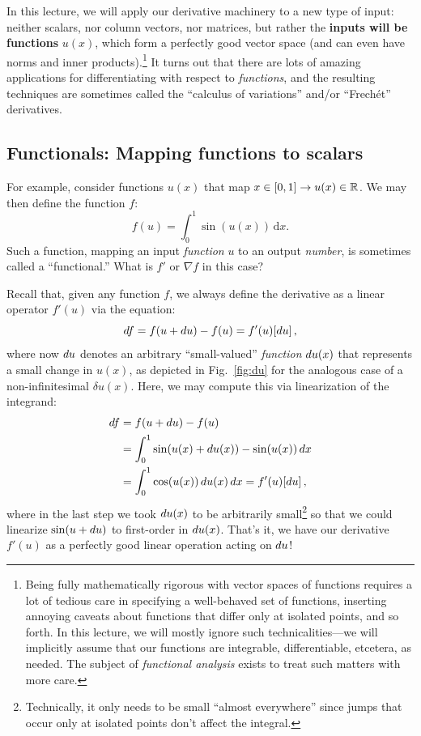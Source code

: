 In this lecture, we will apply our derivative machinery to a new type of input: neither scalars, nor column vectors, nor matrices, but rather the \textbf{inputs will be functions} $u(x)$, which form a perfectly good vector space (and can even have norms and inner products).\footnote{Being fully mathematically rigorous with vector spaces of functions requires a lot of tedious care in specifying a well-behaved set of functions, inserting annoying caveats about functions that differ only at isolated points, and so forth. In this lecture, we will mostly ignore such technicalities---we will implicitly assume that our functions are integrable, differentiable, etcetera, as needed.  The subject of \emph{functional analysis} exists to treat such matters with more care.}  It turns out that there are lots of amazing applications for differentiating with respect to \emph{functions}, and the resulting techniques are sometimes called the ``calculus of variations'' and/or ``Frech{\'{e}}t'' derivatives.


\subsection{Functionals: Mapping functions to scalars}

\begin{example}
For example, consider functions $u(x)$ that map $x\in [0,1] \to u(x) \in \mathbb R$.  We may then define the function $f$:
\[
f(u) = \int_0^1 \sin (u(x)) \,\mathrm{d} x.
\]
Such a function, mapping an input \emph{function} $u$ to an output \emph{number}, is sometimes called a ``functional.''  What is $f'$ or $\nabla f$ in this case?
\end{example}



Recall that, given any function $f$, we always define the derivative as a linear operator $f'(u)$ via the equation:
\[
d f = f (u + d u ) - f(u) = f'(u) [d u] \, ,
\]
where now $d u$ denotes an arbitrary ``small-valued'' \emph{function} $d u(x)$ that represents a small change in $u(x)$, as depicted in Fig.~\ref{fig:du} for the analogous case of a non-infinitesimal $\delta u(x)$.
Here, we may compute this via linearization of the integrand: 
\begin{align*}
    d f &= f(u+ d u) - f(u) \\ 
     &=\int_0^1 \sin (u(x) + d u(x)) - \sin (u(x)) \, d x \\
     &= \int_0^1 \cos (u(x)) \, d u(x) \, d x = f'(u) [d u] \, ,
\end{align*}
where in the last step we took $d u(x)$ to be arbitrarily small\footnote{Technically, it only needs to be small ``almost everywhere'' since jumps that occur only at isolated points don't affect the integral.} so that we could linearize $\sin(u + d u)$ to first-order in $d u(x)$.  That's it, we have our derivative $f'(u)$ as a perfectly good linear operation acting on $d u$!



